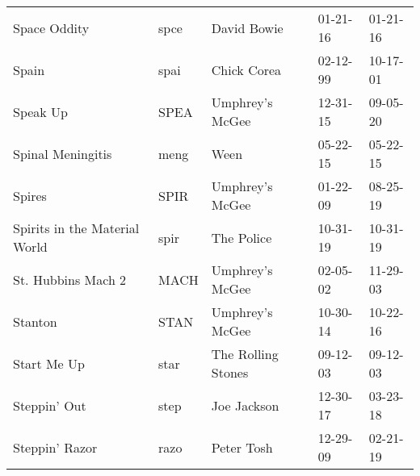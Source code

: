 \begin{longtable}{p{}p{}p{}p{}p{}}
                                                            Space Oddity &          spce &                                              David Bowie &              01-21-16 &             01-21-16 \\
                                                                   Spain &          spai &                                              Chick Corea &              02-12-99 &             10-17-01 \\
                                                                Speak Up &          SPEA &                                          Umphrey's McGee &              12-31-15 &             09-05-20 \\
                                                       Spinal Meningitis &          meng &                                                     Ween &              05-22-15 &             05-22-15 \\
                                                                  Spires &          SPIR &                                          Umphrey's McGee &              01-22-09 &             08-25-19 \\
                                           Spirits in the Material World &          spir &                                               The Police &              10-31-19 &             10-31-19 \\
                                                      St. Hubbins Mach 2 &          MACH &                                          Umphrey's McGee &              02-05-02 &             11-29-03 \\
                                                                 Stanton &          STAN &                                          Umphrey's McGee &              10-30-14 &             10-22-16 \\
                                                             Start Me Up &          star &                                       The Rolling Stones &              09-12-03 &             09-12-03 \\
                                                            Steppin' Out &          step &                                              Joe Jackson &              12-30-17 &             03-23-18 \\
                                                          Steppin' Razor &          razo &                                               Peter Tosh &              12-29-09 &             02-21-19 \\

\end{longtable}
